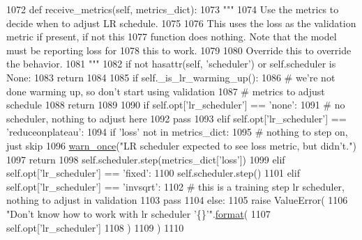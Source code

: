 \begin{DoxyCode}
1072     \textcolor{keyword}{def }receive\_metrics(self, metrics\_dict):
1073         \textcolor{stringliteral}{"""}
1074 \textcolor{stringliteral}{        Use the metrics to decide when to adjust LR schedule.}
1075 \textcolor{stringliteral}{}
1076 \textcolor{stringliteral}{        This uses the loss as the validation metric if present, if not this}
1077 \textcolor{stringliteral}{        function does nothing. Note that the model must be reporting loss for}
1078 \textcolor{stringliteral}{        this to work.}
1079 \textcolor{stringliteral}{}
1080 \textcolor{stringliteral}{        Override this to override the behavior.}
1081 \textcolor{stringliteral}{        """}
1082         \textcolor{keywordflow}{if} \textcolor{keywordflow}{not} hasattr(self, \textcolor{stringliteral}{'scheduler'}) \textcolor{keywordflow}{or} self.scheduler \textcolor{keywordflow}{is} \textcolor{keywordtype}{None}:
1083             \textcolor{keywordflow}{return}
1084 
1085         \textcolor{keywordflow}{if} self.\_is\_lr\_warming\_up():
1086             \textcolor{comment}{# we're not done warming up, so don't start using validation}
1087             \textcolor{comment}{# metrics to adjust schedule}
1088             \textcolor{keywordflow}{return}
1089 
1090         \textcolor{keywordflow}{if} self.opt[\textcolor{stringliteral}{'lr\_scheduler'}] == \textcolor{stringliteral}{'none'}:
1091             \textcolor{comment}{# no scheduler, nothing to adjust here}
1092             \textcolor{keywordflow}{pass}
1093         \textcolor{keywordflow}{elif} self.opt[\textcolor{stringliteral}{'lr\_scheduler'}] == \textcolor{stringliteral}{'reduceonplateau'}:
1094             \textcolor{keywordflow}{if} \textcolor{stringliteral}{'loss'} \textcolor{keywordflow}{not} \textcolor{keywordflow}{in} metrics\_dict:
1095                 \textcolor{comment}{# nothing to step on, just skip}
1096                 \hyperlink{namespaceparlai_1_1utils_1_1misc_acf146e70ea7f6867969a7c2b545d4b4b}{warn\_once}(\textcolor{stringliteral}{"LR scheduler expected to see loss metric, but didn't."})
1097                 \textcolor{keywordflow}{return}
1098             self.scheduler.step(metrics\_dict[\textcolor{stringliteral}{'loss'}])
1099         \textcolor{keywordflow}{elif} self.opt[\textcolor{stringliteral}{'lr\_scheduler'}] == \textcolor{stringliteral}{'fixed'}:
1100             self.scheduler.step()
1101         \textcolor{keywordflow}{elif} self.opt[\textcolor{stringliteral}{'lr\_scheduler'}] == \textcolor{stringliteral}{'invsqrt'}:
1102             \textcolor{comment}{# this is a training step lr scheduler, nothing to adjust in validation}
1103             \textcolor{keywordflow}{pass}
1104         \textcolor{keywordflow}{else}:
1105             \textcolor{keywordflow}{raise} ValueError(
1106                 \textcolor{stringliteral}{"Don't know how to work with lr scheduler '\{\}'"}.\hyperlink{namespaceparlai_1_1chat__service_1_1services_1_1messenger_1_1shared__utils_a32e2e2022b824fbaf80c747160b52a76}{format}(
1107                     self.opt[\textcolor{stringliteral}{'lr\_scheduler'}]
1108                 )
1109             )
1110 
\end{DoxyCode}
